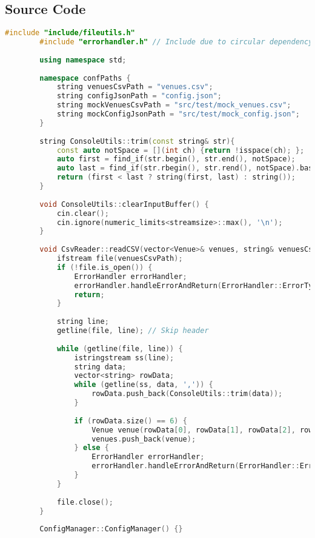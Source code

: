 \documentclass{article}
\begin{document}
	\subsection*{Source Code}
	\begin{mdframed}[backgroundcolor=background, hidealllines=false, innerleftmargin=15pt, innerrightmargin=5pt, innertopmargin=0pt, innerbottommargin=-5pt, linecolor=accent]
	\begin{lstlisting}[language=C++]
		#include "include/fileutils.h"
		#include "errorhandler.h" // Include due to circular dependency between fileutils.h and errorhandler.h
		
		using namespace std;
		
		namespace confPaths {
			string venuesCsvPath = "venues.csv";
			string configJsonPath = "config.json";
			string mockVenuesCsvPath = "src/test/mock_venues.csv";
			string mockConfigJsonPath = "src/test/mock_config.json";
		}
		
		string ConsoleUtils::trim(const string& str){
			const auto notSpace = [](int ch) {return !isspace(ch); };
			auto first = find_if(str.begin(), str.end(), notSpace);
			auto last = find_if(str.rbegin(), str.rend(), notSpace).base();
			return (first < last ? string(first, last) : string());
		}
		
		void ConsoleUtils::clearInputBuffer() {
			cin.clear();
			cin.ignore(numeric_limits<streamsize>::max(), '\n');
		}
		
		void CsvReader::readCSV(vector<Venue>& venues, string& venuesCsvPath) {
			ifstream file(venuesCsvPath);
			if (!file.is_open()) {
				ErrorHandler errorHandler;
				errorHandler.handleErrorAndReturn(ErrorHandler::ErrorType::CONFIG_OPEN_ERROR, venuesCsvPath);
				return;
			}
			
			string line;
			getline(file, line); // Skip header
			
			while (getline(file, line)) {
				istringstream ss(line);
				string data;
				vector<string> rowData;
				while (getline(ss, data, ',')) {
					rowData.push_back(ConsoleUtils::trim(data));
				}
				
				if (rowData.size() == 6) {
					Venue venue(rowData[0], rowData[1], rowData[2], rowData[3], rowData[4], stoi(rowData[5]));
					venues.push_back(venue);
				} else {
					ErrorHandler errorHandler;
					errorHandler.handleErrorAndReturn(ErrorHandler::ErrorType::INVALID_DATA_IN_CSV, venuesCsvPath);
				}
			}
			
			file.close();
		}
		
		ConfigManager::ConfigManager() {}
		

\end{lstlisting}
\end{mdframed}
\end{document}
